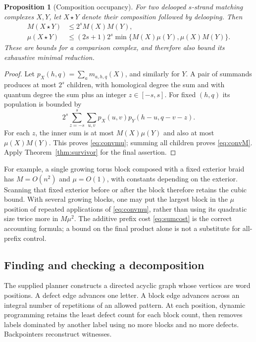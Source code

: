 \documentclass[11pt,letterpaper]{article}
\newtheorem{proposition}[theorem]{Proposition}
\theoremstyle{remark}\newtheorem{remark}[theorem]{Remark}
\begin{document}
\begin{proposition}[Composition occupancy]\label{prop:convolution}
For two delooped $s$-strand matching complexes $X,Y$, let $X\star Y$ denote their composition followed by delooping. Then
\begin{align}
 M(X\star Y)&\le 2^s M(X)M(Y),\label{eq:convM}\\
 \mu(X\star Y)&\le (2s+1)2^s
 \min\{M(X)\mu(Y),\mu(X)M(Y)\}.\label{eq:convmu}
\end{align}
These are bounds for a comparison complex, and therefore also bound its exhaustive minimal reduction.
\end{proposition}
\begin{proof}
Let $p_X(h,q)=\sum_a m_{a,h,q}(X)$, and similarly for $Y$. A pair of summands produces at most $2^s$ children, with homological degree the sum and with quantum degree the sum plus an integer $z\in[-s,s]$. For fixed $(h,q)$ its population is bounded by
\[
 2^s\sum_{z=-s}^s\sum_{u,v}p_X(u,v)p_Y(h-u,q-v-z).
\]
For each $z$, the inner sum is at most $M(X)\mu(Y)$ and also at most $\mu(X)M(Y)$. This proves \eqref{eq:convmu}; summing all children proves \eqref{eq:convM}. Apply Theorem~\ref{thm:survivor} for the final assertion.
\end{proof}
For example, a single growing torus block composed with a fixed exterior braid has $M=O(n^2)$ and $\mu=O(1)$, with constants depending on the exterior. Scanning that fixed exterior before or after the block therefore retains the cubic bound. With several growing blocks, one may put the largest block in the $\mu$ position of repeated applications of \eqref{eq:convmu}, rather than using its quadratic size twice more in $M\mu^2$. The additive prefix cost \eqref{eq:sumcost} is the correct accounting formula; a bound on the final product alone is not a substitute for all-prefix control.

\subsection{Finding and checking a decomposition}
The supplied planner constructs a directed acyclic graph whose vertices are word positions. A defect edge advances one letter. A block edge advances across an integral number of repetitions of an allowed pattern. At each position, dynamic programming retains the least defect count for each block count, then removes labels dominated by another label using no more blocks and no more defects. Backpointers reconstruct witnesses.
\end{document}
